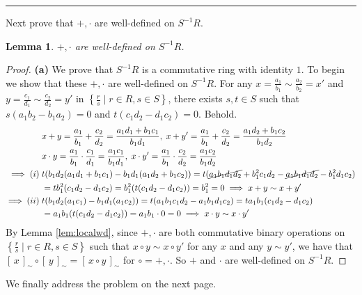 \documentclass[addpoints,10pt]{exam}
\theoremstyle{plain}
\theoremstyle{definition}
\theoremstyle{plain}
\theoremstyle{plain}
\newtheorem{lem}[thm]{Lemma}
\theoremstyle{definition}
\newcommand{\class}[2][]{\ensuremath{\left[\,#2\,\right]_{#1}}}
\begin{document}
\hrule
Next prove that $+,\cdot$ are well-defined on $S^{-1}R$.
\begin{lem}
$+,\cdot$ are well-defined on $S^{-1}R$.
\end{lem}
\begin{proof}
        \textbf{(a)}
    We prove that $S^{-1}R$ is a commutative ring with identity $1$. To begin we show that these $+,\cdot$ are well-defined on $S^{-1}R$. For any $x=\frac{a_{1}}{b_{1}}\sim \frac{a_{2}}{b_{2}}=x'$ and $y=\frac{c_{1}}{d_{1}}\sim \frac{c_{2}}{d_{2}}=y'$ in $\left\{\frac{r}{s} \mid r \in R, s \in S\right\}$, there exists $s,t\in S$ such that $s(a_{1}b_{2}-b_{1}a_{2})=0$ and $t(c_{1}d_{2}-d_{1}c_{2})=0$. 
    Behold.
    \begin{align*}
        &x+y=\frac{a_{1}}{b_{1}}+\frac{c_{2}}{d_{2}}=\frac{a_{1}d_{1}+b_{1}c_{1}}{b_{1}d_{1}},\; x+y'=\frac{a_{1}}{b_{1}}+\frac{c_{2}}{d_{2}}=\frac{a_{1}d_{2}+b_{1}c_{2}}{b_{1}d_{2}}\\
        &x\cdot y=\frac{a_{1}}{b_{1}}\cdot \frac{c_{1}}{d_{1}}=\frac{a_{1}c_{1}}{b_{1}d_{1}},\; x\cdot y'=\frac{a_{1}}{b_{1}}\cdot \frac{c_{2}}{d_{2}}=\frac{a_{1}c_{2}}{b_{1}d_{2}}\\
        \implies (i)\;&t(b_{1}d_{2}(a_{1}d_{1}+b_{1}c_{1})-b_{1}d_{1}(a_{1}d_{2}+b_{1}c_{2}))=t(\cancel{a_{1}b_{1}d_{1}d_{2}}+b_{1}^{2}c_{1}d_{2}-\cancel{a_{1}b_{1}d_{1}d_{2}}-b_{1}^{2}d_{1}c_{2})\\
        &=t b_{1}^{2}(c_{1}d_{2}-d_{1}c_{2})=b_{1}^{2}(t(c_{1}d_{2}-d_{1}c_{2}))=b_{1}^{2}=0\implies x+y\sim x+y'\\
        \implies (ii)\;&t(b_{1}d_{2}(a_{1}c_{1})-b_{1}d_{1}(a_{1}c_{2}))=t(a_{1}b_{1}c_{1}d_{2}-a_{1}b_{1}d_{1}c_{2})=t a_{1}b_{1}(c_{1}d_{2}-d_{1}c_{2})\\
        &=a_{1}b_{1}(t(c_{1}d_{2}-d_{1}c_{2}))=a_{1}b_{1}\cdot 0=0\implies x\cdot y\sim x\cdot y'
    \end{align*}
    By Lemma \ref{lem:localwd}, since $+,\cdot$ are both commutative binary operations on $\left\{\frac{r}{s} \mid r \in R, s \in S\right\}$ such that $x\circ y\sim x\circ y'$ for any $x$ and any $y\sim y'$, we have that $\class[\sim]{x}\circ \class[\sim]{y}=\class[\sim]{x\circ y}$ for $\circ=+,\cdot$. So $+$ and $\cdot$ are well-defined on $S^{-1}R$.
\end{proof}
\newpage
We finally address the problem on the next page.
\end{document}
